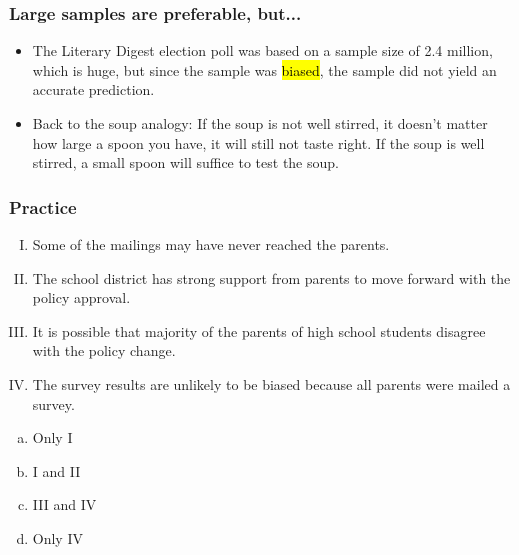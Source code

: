 
\begin{frame}
\frametitle{Large samples are preferable, but...}

\begin{itemize}

\item The Literary Digest election poll was based on a sample size of 2.4 million, which is huge, but since the sample was \hl{biased}, the sample did not yield an accurate prediction.

\item Back to the soup analogy: If the soup is not well stirred, it doesn't matter how large a spoon you have, it will still not taste right. If the soup is well stirred, a small spoon will suffice to test the soup.

\end{itemize}

\end{frame}


\begin{frame}[shrink]
\frametitle{Practice}

{\small
{}

\begin{enumerate}[I.]
\item Some of the mailings may have never reached the parents.
\item The school district has strong support from parents to move forward with the policy approval.
\item It is possible that majority of the parents of high school students disagree with the policy change.
\item The survey results are unlikely to be biased because all parents were mailed a survey. 
\end{enumerate}

\begin{multicols}{5}
\begin{enumerate}[(a)]
\item Only I
\item I and II
\item III and IV
\item Only IV
\end{enumerate}
\end{multicols}
}

\end{frame}

